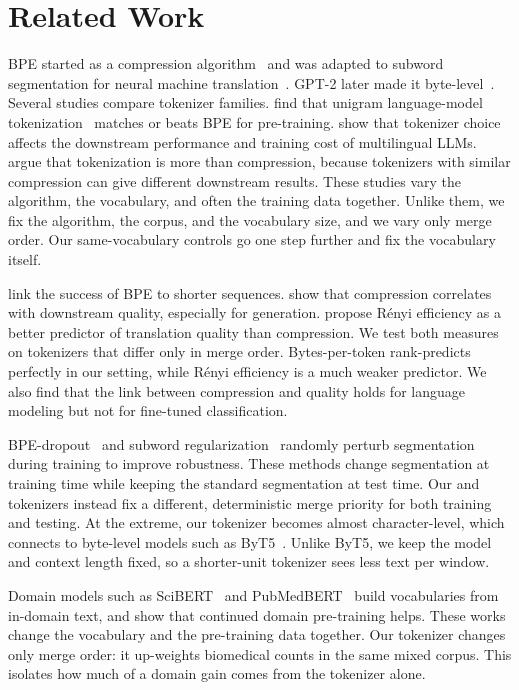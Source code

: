 \section{Related Work}
\label{sec:related}

BPE started as a compression algorithm~\citep{gage1994new} and was adapted to subword segmentation for neural machine translation~\citep{sennrich2016neural}.
GPT-2 later made it byte-level~\citep{radford2019language}.
Several studies compare tokenizer families.
\citet{bostrom2020byte} find that unigram language-model tokenization~\citep{kudo2018subword} matches or beats BPE for pre-training.
\citet{ali2024tokenizer} show that tokenizer choice affects the downstream performance and training cost of multilingual LLMs.
\citet{schmidt2024tokenization} argue that tokenization is more than compression, because tokenizers with similar compression can give different downstream results.
These studies vary the algorithm, the vocabulary, and often the training data together.
Unlike them, we fix the algorithm, the corpus, and the vocabulary size, and we vary only merge order.
Our same-vocabulary controls go one step further and fix the vocabulary itself.

\citet{galle2019investigating} link the success of BPE to shorter sequences.
\citet{goldman2024unpacking} show that compression correlates with downstream quality, especially for generation.
\citet{zouhar2023tokenization} propose R\'enyi efficiency as a better predictor of translation quality than compression.
We test both measures on tokenizers that differ only in merge order.
Bytes-per-token rank-predicts \bpb perfectly in our setting, while R\'enyi efficiency is a much weaker predictor.
We also find that the link between compression and quality holds for language modeling but not for fine-tuned classification.

BPE-dropout~\citep{provilkov2020bpe} and subword regularization~\citep{kudo2018subword} randomly perturb segmentation during training to improve robustness.
These methods change segmentation at training time while keeping the standard segmentation at test time.
Our \randorder and \revorder tokenizers instead fix a different, deterministic merge priority for both training and testing.
At the extreme, our \revlearn tokenizer becomes almost character-level, which connects to byte-level models such as ByT5~\citep{xue2022byt5}.
Unlike ByT5, we keep the model and context length fixed, so a shorter-unit tokenizer sees less text per window.

Domain models such as SciBERT~\citep{beltagy2019scibert} and PubMedBERT~\citep{gu2021domain} build vocabularies from in-domain text, and \citet{gururangan2020don} show that continued domain pre-training helps.
These works change the vocabulary and the pre-training data together.
Our \domain tokenizer changes only merge order: it up-weights biomedical counts in the same mixed corpus.
This isolates how much of a domain gain comes from the tokenizer alone.
